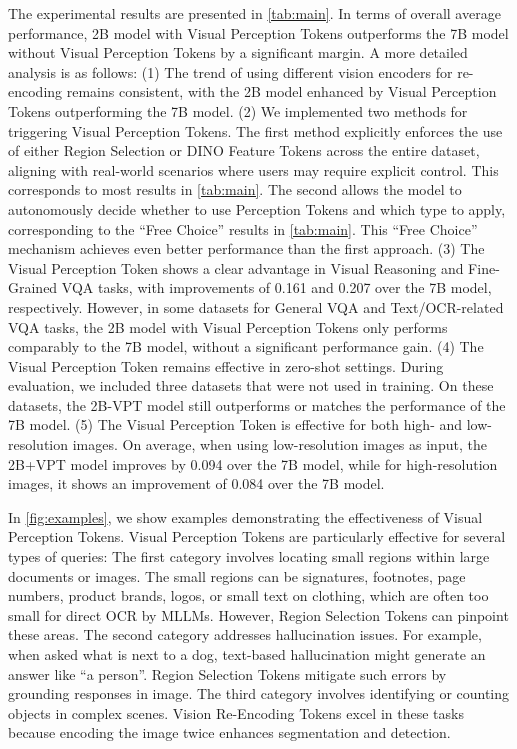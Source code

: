 The experimental results are presented in \cref{tab:main}. In terms of overall average performance, 2B model with Visual Perception Tokens outperforms the 7B model without Visual Perception Tokens by a significant margin. 
A more detailed analysis is as follows:
(1) The trend of using different vision encoders for re-encoding remains consistent, with the 2B model enhanced by Visual Perception Tokens outperforming the 7B model.  
(2) We implemented two methods for triggering Visual Perception Tokens. The first method explicitly enforces the use of either Region Selection or DINO Feature Tokens across the entire dataset, aligning with real-world scenarios where users may require explicit control. This corresponds to most results in \cref{tab:main}.  
The second allows the model to autonomously decide whether to use Perception Tokens and which type to apply, corresponding to the ``Free Choice'' results in \cref{tab:main}. This ``Free Choice'' mechanism achieves even better performance than the first approach.
(3) The Visual Perception Token shows a clear advantage in Visual Reasoning and Fine-Grained VQA tasks, with improvements of 0.161 and 0.207 over the 7B model, respectively. However, in some datasets for General VQA and Text/OCR-related VQA tasks, the 2B model with Visual Perception Tokens only performs comparably to the 7B model, without a significant performance gain.
(4) The Visual Perception Token remains effective in zero-shot settings. During evaluation, we included three datasets that were not used in training. On these datasets, the 2B-VPT model still outperforms or matches the performance of the 7B model.
(5) The Visual Perception Token is effective for both high- and low-resolution images. On average, when using low-resolution images as input, the 2B+VPT model improves by 0.094 over the 7B model, while for high-resolution images, it shows an improvement of 0.084 over the 7B model.

In \cref{fig:examples}, we show examples demonstrating the effectiveness of Visual Perception Tokens.
Visual Perception Tokens are particularly effective for several types of queries:
The first category involves locating small regions within large documents or images. The small regions can be signatures, footnotes, page numbers, product brands, logos, or small text on clothing, which are often too small for direct OCR by MLLMs. However, Region Selection Tokens can pinpoint these areas.
The second category addresses hallucination issues. For example, when asked what is next to a dog, text-based hallucination might generate an answer like ``a person''. Region Selection Tokens mitigate such errors by grounding responses in image.
The third category involves identifying or counting objects in complex scenes. Vision Re-Encoding Tokens excel in these tasks because encoding the image twice enhances segmentation and detection.

